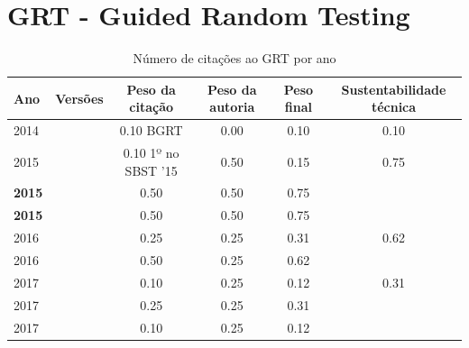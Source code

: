 \section{GRT - Guided Random Testing}


\begin{table}[H]
\caption{Número de citações ao GRT  por ano}
\centering
\begin{tabular}{| l | c | c | c | c | c |}
  \hline
  Ano & Versões & Peso da citação & Peso da autoria & Peso final & Sustentabilidade técnica \\
  \hline
            2014
          &
          
          &
          0.10
            {\tiny BGRT}
          &
          0.00
          &
          0.10
          &
            {\color{red} 0.10}
          \\
\hline
            2015
          &
          
          &
          0.10
            {\tiny 1º no SBST '15}
          &
          0.50
          &
          0.15
          &
            {\color{blue} 0.75}
          \\
            {\bf 2015}
          &
          
          &
          0.50
          &
          0.50
          &
          0.75
          &
          \\
            {\bf 2015}
          &
          
          &
          0.50
          &
          0.50
          &
          0.75
          &
          \\
\hline
            2016
          &
          
          &
          0.25
          &
          0.25
          &
          0.31
          &
            {\color{blue} 0.62}
          \\
            2016
          &
          
          &
          0.50
          &
          0.25
          &
          0.62
          &
          \\
\hline
            2017
          &
          
          &
          0.10
          &
          0.25
          &
          0.12
          &
            {\color{red} 0.31}
          \\
            2017
          &
          
          &
          0.25
          &
          0.25
          &
          0.31
          &
          \\
            2017
          &
          
          &
          0.10
          &
          0.25
          &
          0.12
          &
          \\
\hline
\end{tabular}
\end{table}



